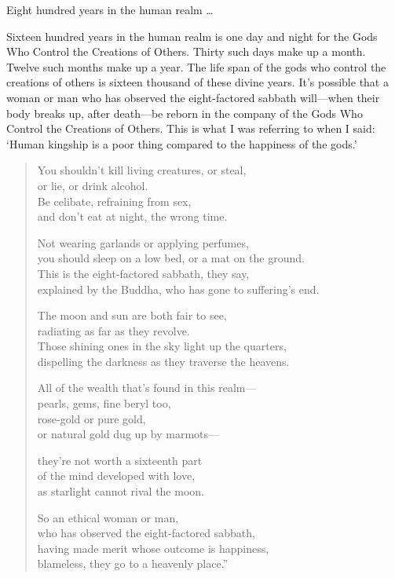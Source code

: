 \documentclass[12pt,openany]{book}%
\begin{document}
Eight hundred years in the human realm … 

Sixteen hundred years in the human realm is one day and night for the Gods Who Control the Creations of Others. Thirty such days make up a month. Twelve such months make up a year. The life span of the gods who control the creations of others is sixteen thousand of these divine years. It’s possible that a woman or man who has observed the eight-factored sabbath will—when their body breaks up, after death—be reborn in the company of the Gods Who Control the Creations of Others. This is what I was referring to when I said: ‘Human kingship is a poor thing compared to the happiness of the gods.’ 

\begin{verse}%
You shouldn’t kill living creatures, or steal, \\
or lie, or drink alcohol. \\
Be celibate, refraining from sex, \\
and don’t eat at night, the wrong time. 

Not wearing garlands or applying perfumes, \\
you should sleep on a low bed, or a mat on the ground. \\
This is the eight-factored sabbath, they say, \\
explained by the Buddha, who has gone to suffering’s end. 

The moon and sun are both fair to see, \\
radiating as far as they revolve. \\
Those shining ones in the sky light up the quarters, \\
dispelling the darkness as they traverse the heavens. 

All of the wealth that’s found in this realm—\\
pearls, gems, fine beryl too, \\
rose-gold or pure gold, \\
or natural gold dug up by marmots—

they’re not worth a sixteenth part \\
of the mind developed with love, \\
as starlight cannot rival the moon. 

So an ethical woman or man, \\
who has observed the eight-factored sabbath, \\
having made merit whose outcome is happiness, \\
blameless, they go to a heavenly place.” 

%
\end{verse}
\end{document}
